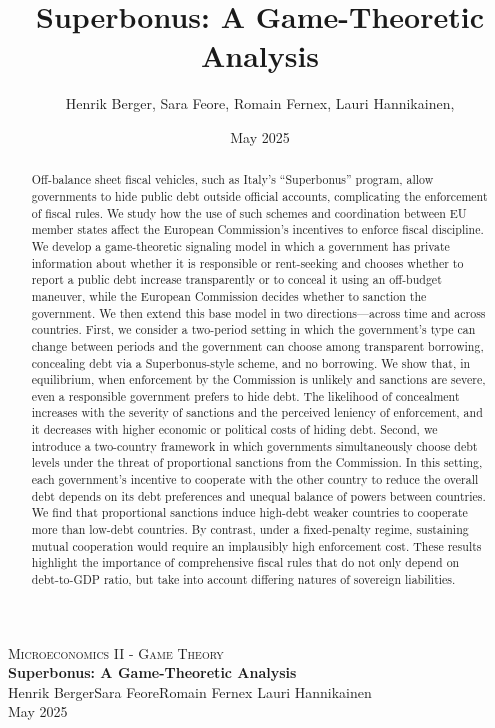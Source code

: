 \documentclass{article}
\title{Superbonus: A Game-Theoretic Analysis}
\author{Henrik Berger, Sara Feore, Romain Fernex, Lauri Hannikainen, }
\date{May 2025}
\begin{document}
\begin{titlepage}
  \centering
  {\Large\scshape Microeconomics II - Game Theory}\\[2cm]
  {\huge\bfseries Superbonus: A Game-Theoretic Analysis}\\[1.5cm]
  {\large  Henrik Berger\quad Sara Feore\quad Romain Fernex \quad Lauri Hannikainen}\\[1cm]
  {\large May 2025}\\[2cm]
 


\begin{abstract}
 Off-balance sheet fiscal vehicles, such as Italy’s “Superbonus” program, allow governments to hide public debt outside official accounts, complicating the enforcement of fiscal rules. We study how the use of such schemes and coordination between EU member states affect the European Commission’s incentives to enforce fiscal discipline. We develop a game-theoretic signaling model in which a government has private information about whether it is responsible or rent-seeking and chooses whether to report a public debt increase transparently or to conceal it using an off-budget maneuver, while the European Commission decides whether to sanction the government. We then extend this base model in two directions—across time and across countries. First, we consider a two-period setting in which the government’s type can change between periods and the government can choose among transparent borrowing, concealing debt via a Superbonus-style scheme, and no borrowing. We show that, in equilibrium, when enforcement by the Commission is unlikely and sanctions are severe, even a responsible government prefers to hide debt. The likelihood of concealment increases with the severity of sanctions and the perceived leniency of enforcement, and it decreases with higher economic or political costs of hiding debt. Second, we introduce a two-country framework in which governments simultaneously choose debt levels under the threat of proportional sanctions from the Commission. In this setting, each government’s incentive to cooperate with the other country to reduce the overall debt depends on its debt preferences and unequal balance of powers between countries. We find that proportional sanctions induce high-debt weaker countries to cooperate more than low-debt countries. By contrast, under a fixed-penalty regime, sustaining mutual cooperation would require an implausibly high enforcement cost. These results highlight the importance of comprehensive fiscal rules that do not only depend on debt-to-GDP ratio, but take into account differing natures of sovereign liabilities. 
\end{abstract}

\end{titlepage}
\setcounter{page}{1}
\end{document}
